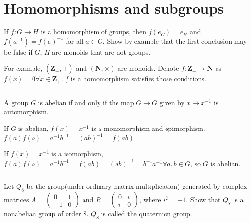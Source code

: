 \section{Homomorphisms and subgroups}
\begin{ex}
    If $f: G \to H$ is a homomorphism of groups, then $f(e_G) = e_H$ and $f(a^{-1}) = f(a)^{-1}$ for all $a \in G$. Show by example that the first conclusion may be false if $G$, $H$ are monoids that are not groups.
\end{ex}

\begin{answer}
    For example, $(\mathbf{Z_+,+})$ and $(\mathbf{N},\times)$ are monoids. Denote $f:\mathbf{Z_+}\to \mathbf{N}$ as $f(x)=0 \forall x \in \mathbf{Z_+}$. $f$ is a homomorphism satisfies those conditions.
\end{answer}

$$ $$

\begin{ex}
    A group $G$ is abelian if and only if the map $G\to G$ given by $x\mapsto x^{-1}$ is automorphism.
\end{ex}

\begin{answer}
    If $G$ is abelian, $f(x)=x^{-1}$ is a monomorphism and epimorphism. $f(a)f(b)=a^{-1}b^{-1}=(ab)^{-1}=f(ab)$

    If $f(x)=x^{-1}$ is a isomorphism, $f(a)f(b)=a^{-1}b^{-1}=f(ab)=(ab)^{-1}=b^{-1}a^{-1} \forall a,b\in G$, so $G$ is abelian.
\end{answer}

$$ $$

\begin{ex}
    Let $Q_8$ be the group(under ordinary matrix multiplication) generated by complex matrices $A = \begin{pmatrix}
        0 & 1 \\
        -1 & 0
    \end{pmatrix}$ and $B = \begin{pmatrix}
        0 & i\\
        i & 0
    \end{pmatrix}$, where $i^{2}=-1$. Show that $Q_8$ is a nonabelian group of order 8. $Q_8$ is called the quaternion group.
\end{ex}

